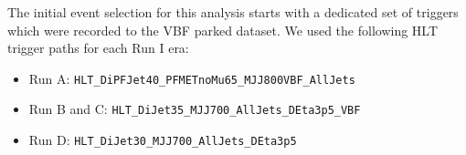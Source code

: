 % 
% 
% 
% 


The initial event selection for this analysis starts with a dedicated set of triggers which were recorded to the \gls{VBF} parked dataset. We used the following \gls{HLT} trigger paths for each Run I era:

\begin{itemize}
  \item Run A:       \verb!HLT_DiPFJet40_PFMETnoMu65_MJJ800VBF_AllJets!
  \item Run B and C: \verb!HLT_DiJet35_MJJ700_AllJets_DEta3p5_VBF!
  \item Run D:       \verb!HLT_DiJet30_MJJ700_AllJets_DEta3p5!
\end{itemize}

